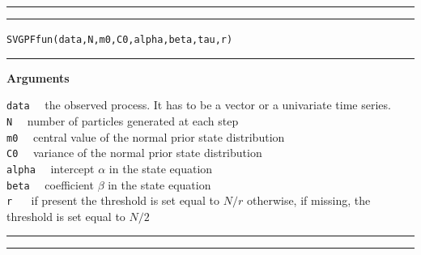 \documentclass[
]{book}
\theoremstyle{break}
\theoremstyle{nonumberplain}
\begin{document}
\hfill\break

\hrule
\hrule

\hfill\break
\texttt{SVGPFfun(data,N,m0,C0,alpha,beta,tau,r)}\\

\hrule

\textbf{Arguments}

\texttt{data} ~~the observed process. It has to be a vector or a
univariate time series.\\
\texttt{N} ~~number of particles generated at each step\\
\texttt{m0} ~~central value of the normal prior state distribution\\
\texttt{C0} ~~variance of the normal prior state distribution\\
\texttt{alpha} ~~intercept \(\alpha\) in the state equation\\
\texttt{beta} ~~coefficient \(\beta\) in the state equation\\
\texttt{r} ~~ if present the threshold is set equal to \(N/r\)
otherwise, if missing, the threshold is set equal to \(N/2\)

\hrule
\hrule
\end{document}
